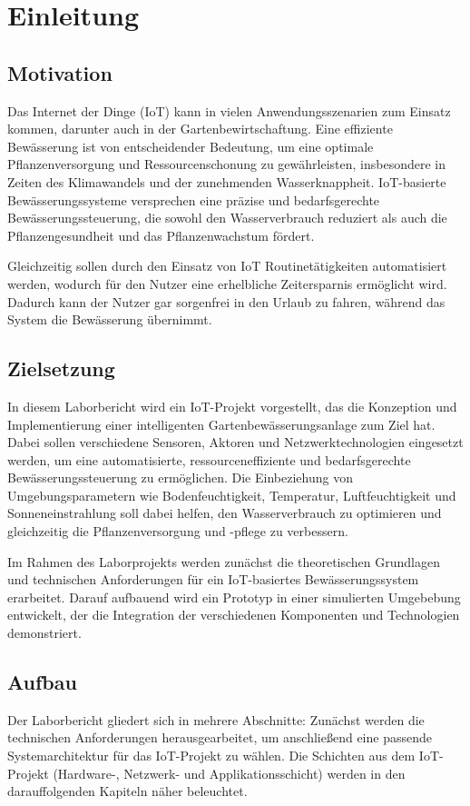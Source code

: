 
\section{Einleitung}

\subsection{Motivation}
Das Internet der Dinge (IoT) kann in vielen Anwendungsszenarien zum Einsatz kommen, darunter auch in der Gartenbewirtschaftung. Eine effiziente Bewässerung ist von entscheidender Bedeutung, um eine optimale Pflanzenversorgung und Ressourcenschonung zu gewährleisten, insbesondere in Zeiten des Klimawandels und der zunehmenden Wasserknappheit. IoT-basierte Bewässerungssysteme versprechen eine präzise und bedarfsgerechte Bewässerungssteuerung, die sowohl den Wasserverbrauch reduziert als auch die Pflanzengesundheit und das Pflanzenwachstum fördert.

Gleichzeitig sollen durch den Einsatz von IoT Routinetätigkeiten automatisiert werden, wodurch für den Nutzer eine erhelbliche Zeitersparnis ermöglicht wird.
Dadurch kann der Nutzer gar sorgenfrei in den Urlaub zu fahren, während das System die Bewässerung übernimmt.

\subsection{Zielsetzung}

In diesem Laborbericht wird ein IoT-Projekt vorgestellt, das die Konzeption und Implementierung einer intelligenten Gartenbewässerungsanlage zum Ziel hat. Dabei sollen verschiedene Sensoren, Aktoren und Netzwerktechnologien eingesetzt werden, um eine automatisierte, ressourceneffiziente und bedarfsgerechte Bewässerungssteuerung zu ermöglichen. Die Einbeziehung von Umgebungsparametern wie Bodenfeuchtigkeit, Temperatur, Luftfeuchtigkeit und Sonneneinstrahlung soll dabei helfen, den Wasserverbrauch zu optimieren und gleichzeitig die Pflanzenversorgung und -pflege zu verbessern.

Im Rahmen des Laborprojekts werden zunächst die theoretischen Grundlagen und technischen Anforderungen für ein IoT-basiertes Bewässerungssystem erarbeitet. Darauf aufbauend wird ein Prototyp in einer simulierten Umgebebung entwickelt, der die Integration der verschiedenen Komponenten und Technologien demonstriert. 

\subsection{Aufbau}

Der Laborbericht gliedert sich in mehrere Abschnitte: Zunächst werden die technischen Anforderungen herausgearbeitet, um anschließend eine passende Systemarchitektur für das IoT-Projekt zu wählen. 
Die Schichten aus dem IoT-Projekt (Hardware-, Netzwerk- und Applikationsschicht) werden in den darauffolgenden Kapiteln näher beleuchtet.
